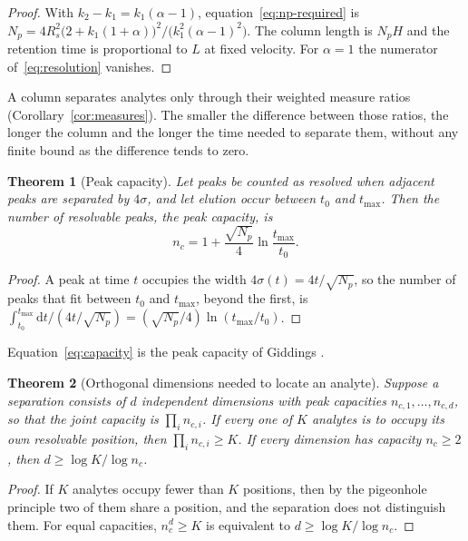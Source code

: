 \documentclass[11pt,a4paper]{article}
\newtheorem{theorem}{Theorem}[section]
\theoremstyle{definition}
\theoremstyle{remark}
\newcommand{\dd}{\mathrm{d}}
\begin{document}
\begin{proof}
With $k_2-k_1=k_1(\alpha-1)$, equation~\eqref{eq:np-required} is $N_p=4R_s^{2}\bigl(2+k_1(1+\alpha)\bigr)^{2}/\bigl(k_1^{2}(\alpha-1)^{2}\bigr)$.
The column length is $N_pH$ and the retention time is proportional to $L$ at fixed velocity.
For $\alpha=1$ the numerator of~\eqref{eq:resolution} vanishes.
\end{proof}

A column separates analytes only through their weighted measure ratios (Corollary~\ref{cor:measures}).
The smaller the difference between those ratios, the longer the column and the longer the time needed to separate them, without any finite bound as the difference tends to zero.

\begin{theorem}[Peak capacity]
\label{thm:capacity}
Let peaks be counted as resolved when adjacent peaks are separated by $4\sigma$, and let elution occur between $t_0$ and $t_{\max}$.
Then the number of resolvable peaks, the \emph{peak capacity}, is
\begin{equation}
n_c=1+\frac{\sqrt{N_p}}{4}\ln\frac{t_{\max}}{t_0}.
\label{eq:capacity}
\end{equation}
\end{theorem}

\begin{proof}
A peak at time $t$ occupies the width $4\sigma(t)=4t/\sqrt{N_p}$, so the number of peaks that fit between $t_0$ and $t_{\max}$, beyond the first, is $\int_{t_0}^{t_{\max}}\dd t/(4t/\sqrt{N_p})=(\sqrt{N_p}/4)\ln(t_{\max}/t_0)$.
\end{proof}

Equation~\eqref{eq:capacity} is the peak capacity of Giddings \citep{giddings1967}.

\begin{theorem}[Orthogonal dimensions needed to locate an analyte]
\label{thm:dimensions}
Suppose a separation consists of $d$ independent dimensions with peak capacities $n_{c,1},\dots,n_{c,d}$, so that the joint capacity is $\prod_in_{c,i}$.
If every one of $K$ analytes is to occupy its own resolvable position, then $\prod_in_{c,i}\ge K$.
If every dimension has capacity $n_c\ge2$, then $d\ge\log K/\log n_c$.
\end{theorem}

\begin{proof}
If $K$ analytes occupy fewer than $K$ positions, then by the pigeonhole principle two of them share a position, and the separation does not distinguish them.
For equal capacities, $n_c^{d}\ge K$ is equivalent to $d\ge\log K/\log n_c$.
\end{proof}
\end{document}
